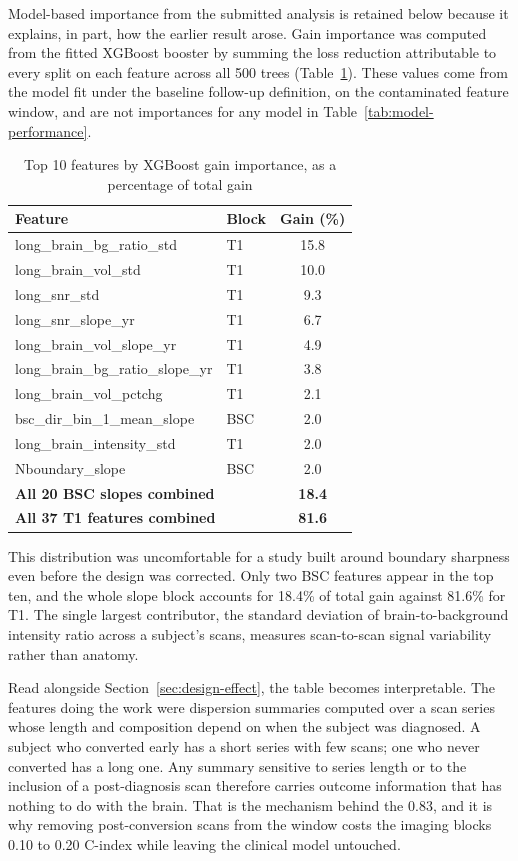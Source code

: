 \documentclass[blue]{ludusofficial}  %
\begin{document}
Model-based importance from the submitted analysis is retained below because it explains, in part, how the earlier result arose. Gain importance was computed from the fitted XGBoost booster by summing the loss reduction attributable to every split on each feature across all 500 trees (Table~\ref{tab:xgb-importance}). These values come from the model fit under the baseline follow-up definition, on the contaminated feature window, and are not importances for any model in Table~\ref{tab:model-performance}.

\begin{table}[htbp]
\centering
\caption{Top 10 features by XGBoost gain importance, as a percentage of total gain}
\label{tab:xgb-importance}
\begin{tabular}{llc}
\hline
\textbf{Feature} & \textbf{Block} & \textbf{Gain (\%)} \\
\hline
long\_brain\_bg\_ratio\_std & T1 & 15.8 \\
long\_brain\_vol\_std & T1 & 10.0 \\
long\_snr\_std & T1 & 9.3 \\
long\_snr\_slope\_yr & T1 & 6.7 \\
long\_brain\_vol\_slope\_yr & T1 & 4.9 \\
long\_brain\_bg\_ratio\_slope\_yr & T1 & 3.8 \\
long\_brain\_vol\_pctchg & T1 & 2.1 \\
bsc\_dir\_bin\_1\_mean\_slope & BSC & 2.0 \\
long\_brain\_intensity\_std & T1 & 2.0 \\
Nboundary\_slope & BSC & 2.0 \\
\hline
\multicolumn{2}{l}{\textbf{All 20 BSC slopes combined}} & \textbf{18.4} \\
\multicolumn{2}{l}{\textbf{All 37 T1 features combined}} & \textbf{81.6} \\
\hline
\end{tabular}
\end{table}

This distribution was uncomfortable for a study built around boundary sharpness even before the design was corrected. Only two BSC features appear in the top ten, and the whole slope block accounts for 18.4\% of total gain against 81.6\% for T1. The single largest contributor, the standard deviation of brain-to-background intensity ratio across a subject's scans, measures scan-to-scan signal variability rather than anatomy.

Read alongside Section~\ref{sec:design-effect}, the table becomes interpretable. The features doing the work were dispersion summaries computed over a scan series whose length and composition depend on when the subject was diagnosed. A subject who converted early has a short series with few scans; one who never converted has a long one. Any summary sensitive to series length or to the inclusion of a post-diagnosis scan therefore carries outcome information that has nothing to do with the brain. That is the mechanism behind the 0.83, and it is why removing post-conversion scans from the window costs the imaging blocks 0.10 to 0.20 C-index while leaving the clinical model untouched.
\end{document}
